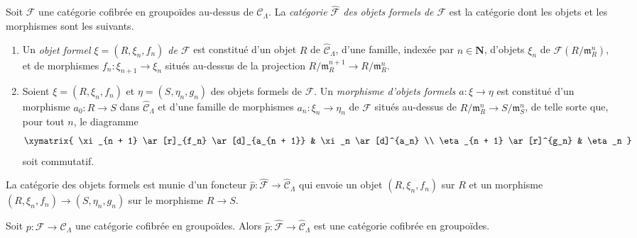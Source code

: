 \begin{definition}
\label{definition-formal-objects}
Soit $\mathcal{F}$ une catégorie cofibrée en groupoïdes au-dessus de
$\mathcal{C}_\Lambda$. La {\it catégorie $\widehat{\mathcal{F}}$ des objets
formels de $\mathcal{F}$} est la catégorie dont les objets et les morphismes
sont les suivants.
\begin{enumerate}
\item Un {\it objet formel $\xi = (R, \xi_n, f_n)$ de $\mathcal{F}$} est
constitué d'un objet $R$ de $\widehat{\mathcal{C}}_\Lambda$, d'une famille,
indexée par $n \in \mathbf{N}$, d'objets $\xi_n$ de
$\mathcal{F}(R/\mathfrak m_R^n)$, et de morphismes
$f_n : \xi_{n + 1} \to \xi_n$ situés au-dessus de la projection
$R/\mathfrak m_R^{n + 1} \to R/\mathfrak m_R^n$.
\item Soient $\xi = (R, \xi_n, f_n)$ et $\eta = (S, \eta_n, g_n)$ des
objets formels de $\mathcal{F}$. Un {\it morphisme d'objets formels
$a : \xi \to \eta$} est constitué d'un morphisme $a_0 : R \to S$ dans
$\widehat{\mathcal{C}}_\Lambda$ et d'une famille de morphismes
$a_n : \xi_n \to \eta_n$ de $\mathcal{F}$ situés au-dessus de
$R/\mathfrak m_R^n \to S/\mathfrak m_S^n$,
de telle sorte que, pour tout $n$, le diagramme
$$
\xymatrix{
\xi_{n + 1} \ar[r]_{f_n} \ar[d]_{a_{n + 1}} & \xi_n \ar[d]^{a_n} \\
\eta_{n + 1} \ar[r]^{g_n} & \eta_n
}
$$
soit commutatif.
\end{enumerate}
\end{definition}

\noindent
La catégorie des objets formels est munie d'un foncteur $\widehat{p}:
\widehat{\mathcal{F}} \to \widehat{\mathcal{C}}_\Lambda$ qui envoie un objet
$(R, \xi_n, f_n)$ sur $R$ et un morphisme
$(R, \xi_n, f_n) \to (S, \eta_n, g_n)$ sur le morphisme $R \to S$.

\begin{lemma}
\label{lemma-completion-cofibred}
Soit $p : \mathcal{F} \to \mathcal{C}_\Lambda$ une catégorie cofibrée en
groupoïdes. Alors
$\widehat{p} : \widehat{\mathcal{F}} \to \widehat{\mathcal{C}}_\Lambda$
est une catégorie cofibrée en groupoïdes.
\end{lemma}

